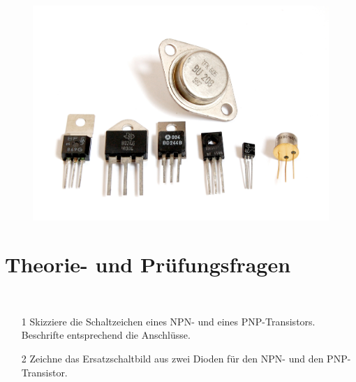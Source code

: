 

\begin{figure}
 \vspace{-6cm}
  \includegraphics[scale=0.4]{Transistor/Bilder/Transistors-white.jpg}
 \vspace{-6cm}
\end{figure}

\section{Theorie- und Prüfungsfragen}

~~~~~~

\begin{enumerate}
\itemsep1pt\parskip0pt
\item[1] Skizziere die Schaltzeichen eines NPN- und eines PNP-Transistors. Beschrifte  entsprechend die Anschlüsse.
\item[2] Zeichne das Ersatzschaltbild aus zwei Dioden für den NPN- und den PNP-Transistor.
\end{enumerate}


